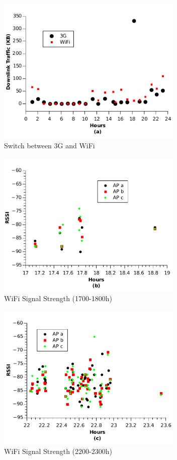 \begin{figure}[h!tbp]
\centering
\includegraphics[width = 3.5in]{graphs/traffic_0202.pdf}
\caption{Switch between 3G and WiFi} 
\label{fig:switch}
\end{figure}

\begin{figure}[h!tbp]
\centering
\includegraphics[width = 3.5in]{graphs/weak_wifi_68.pdf}
\caption{WiFi Signal Strength (1700-1800h)} 
\label{fig:weak_wifi_68}
\end{figure}

\begin{figure}[h!tbp]
\centering
\includegraphics[width = 3.5in]{graphs/weak_wifi_1012.pdf}
\caption{WiFi Signal Strength (2200-2300h)} 
\label{fig:weak_wifi_1012}
\end{figure}

